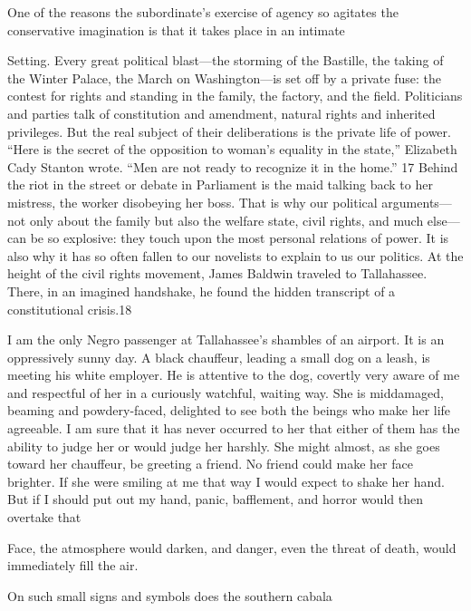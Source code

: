  \par 
One of the reasons the subordinate’s exercise of agency so agitates the conservative imagination is that it takes place in an intimate
 \par 
Setting. Every great political blast—the storming of the Bastille, the taking of the Winter Palace, the March on Washington—is set off by a private fuse: the contest for rights and standing in the family, the factory, and the field. Politicians and parties talk of constitution and amendment, natural rights and inherited privileges. But the real subject of their deliberations is the private life of power. “Here is the secret of the opposition to woman’s equality in the state,” Elizabeth Cady Stanton wrote. “Men are not ready to recognize it in the home.” {\color{blue}17} Behind the riot in the street or debate in Parliament is the maid talking back to her mistress, the worker disobeying her boss. That is why our political arguments—not only about the family but also the welfare state, civil rights, and much else—can be so explosive: they touch upon the most personal relations of power. It is also why it has so often fallen to our novelists to explain to us our politics. At the height of the civil rights movement, James Baldwin traveled to Tallahassee. There, in an imagined handshake, he found the hidden transcript of a constitutional crisis.{\color{blue}18}
 \par 
I am the only Negro passenger at Tallahassee’s shambles of an airport. It is an oppressively sunny day. A black chauffeur, leading a small dog on a leash, is meeting his white employer. He is attentive to the dog, covertly very aware of me and respectful of her in a curiously watchful, waiting way. She is middamaged, beaming and powdery-faced, delighted to see both the beings who make her life agreeable. I am sure that it has never occurred to her that either of them has the ability to judge her or would judge her harshly. She might almost, as she goes toward her chauffeur, be greeting a friend. No friend could make her face brighter. If she were smiling at me that way I would expect to shake her hand. But if I should put out my hand, panic, bafflement, and horror would then overtake that
 \par 
Face, the atmosphere would darken, and danger, even the threat of death, would immediately fill the air.
 \par 
On such small signs and symbols does the southern cabala
 \par 
